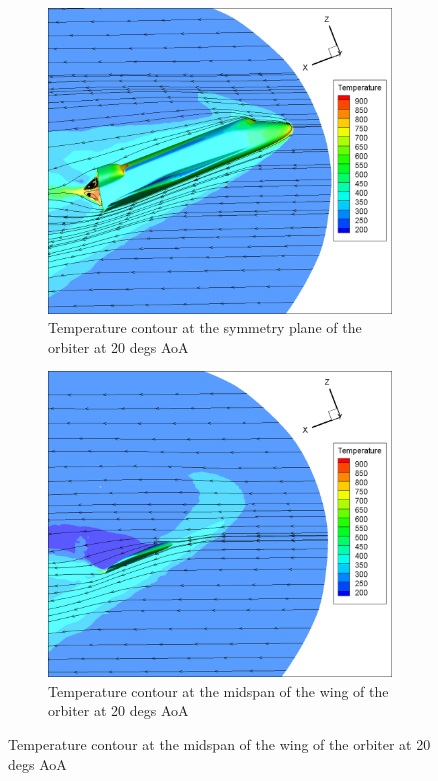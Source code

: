 \begin{figure}[H]

	\centering
    \begin{subfigure}[b]{0.65\textwidth}
         \centering
		 \includegraphics[width=\textwidth]{report_images/20_sym_temp_contour.png}
		 \caption{Temperature contour at the symmetry plane of the orbiter at 20 degs AoA}
		 \label{fig: 20_sym_temp_contour}
    \end{subfigure} 
    \begin{subfigure}[b]{0.65\textwidth}
         \centering
		 \includegraphics[width=\textwidth]{report_images/20_wing_temp_contour.png}
		 \caption{Temperature contour at the midspan of the wing of the orbiter at 20 degs AoA}
		 \label{fig: 20_wing_temp_contour}
    \end{subfigure}
\end{figure}


